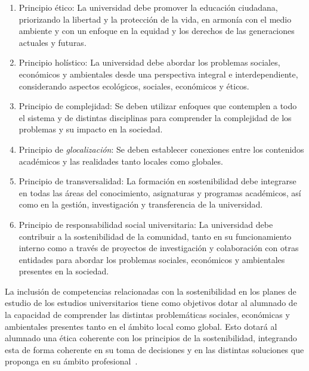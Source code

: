 \begin{enumerate}
	\item Principio ético: La universidad debe promover la educación ciudadana, priorizando la libertad y la protección de la vida, en armonía con el medio ambiente y con un enfoque en la equidad y los derechos de las generaciones actuales y futuras.
	\item Principio holístico: La universidad debe abordar los problemas sociales, económicos y ambientales desde una perspectiva integral e interdependiente, considerando aspectos ecológicos, sociales, económicos y éticos.
	\item Principio de complejidad: Se deben utilizar enfoques que contemplen a todo el sistema y de distintas disciplinas para comprender la complejidad de los problemas y su impacto en la sociedad.
	\item Principio de \textit{glocalización}: Se deben establecer conexiones entre los contenidos académicos y las realidades tanto locales como globales.
	\item Principio de transversalidad: La formación en sostenibilidad debe integrarse en todas las áreas del conocimiento, asignaturas y programas académicos, así como en la gestión, investigación y transferencia de la universidad.
	\item Principio de responsabilidad social universitaria: La universidad debe contribuir a la sostenibilidad de la comunidad, tanto en su funcionamiento interno como a través de proyectos de investigación y colaboración con otras entidades para abordar los problemas sociales, económicos y ambientales presentes en la sociedad.
\end{enumerate}

La inclusión de competencias relacionadas con la sostenibilidad en los planes de estudio de los estudios universitarios tiene como objetivos dotar al alumnado de 
la capacidad de comprender las distintas problemáticas sociales, económicas y ambientales presentes tanto en el ámbito local como global. Esto dotará al alumnado una ética coherente con los principios de la sostenibilidad, integrando esta de forma coherente en su toma de decisiones y en las distintas soluciones que proponga en su ámbito profesional~\cite{direcsost}.


